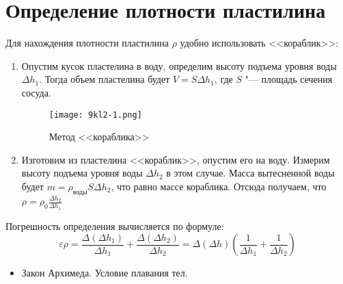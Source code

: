 \section{Определение плотности пластилина}
\SolveVariant
Для нахождения плотности пластилина \(\rho\) удобно использовать <<кораблик>>:
\begin{enumerate}
  \item Опустим кусок пластелина в воду, определим высоту подъема уровня воды \(\Delta h_1\). Тогда объем пластелина будет \(V=S\Delta h_1\), где \(S\) "--- площадь сечения сосуда.
  \begin{figure}[h]
    \centering
    \texttt{[image: 9kl2-1.png]}
    \caption{Метод <<кораблика>>}
  \end{figure}
  \item Изготовим из пластелина <<кораблик>>, опустим его на воду. Измерим высоту подъема уровня воды \(\Delta h_2\) в этом случае. Масса вытесненной воды будет \(m=\rho_\text{воды} S\Delta h_2 \), что равно массе кораблика. Отсюда получаем, что \( \rho = \rho_0 \frac{\Delta h_2}{\Delta h_1}\)
\end{enumerate}
\MesErrors
Погрешность определения вычисляется по формуле:
\begin{equation*}
\varepsilon \rho = \frac{\Delta(\Delta h_1)}{\Delta h_1} + \frac{\Delta(\Delta h_2)}{\Delta h_2}=\Delta(\Delta h) \left( \frac{1}{\Delta h_1} + \frac{1}{\Delta h_2} \right)
\end{equation*}
\SchoolBase
\begin{itemize}
  \item Закон Архимеда. Условие плавания тел.
\end{itemize}
\AdditionalQuestions
